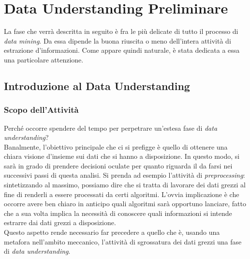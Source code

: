 
\chapter{Data Understanding Preliminare}

La fase che verrà descritta in seguito è fra le più delicate di tutto il processo di \textit{data mining}. Da essa dipende la buona riuscita o meno dell'intera attività di estrazione d'informazioni. Come appare quindi naturale, è stata dedicata a essa una particolare attenzione.

    \section{Introduzione al Data Understanding}

        \subsection{Scopo dell'Attività}

            Perché occorre spendere del tempo per perpetrare un'estesa fase di \textit{data understanding}? \\

            Banalmente, l'obiettivo principale che ci si prefigge è quello di ottenere una chiara visione d'insieme sui dati che si hanno a disposizione. In questo modo, si sarà in grado di prendere decisioni oculate per quanto riguarda il da farsi nei successivi passi di questa analisi. Si prenda ad esempio l'attività di \textit{preprocessing}: sintetizzando al massimo, possiamo dire che si tratta di lavorare dei dati grezzi al fine di renderli a essere processati da certi algoritmi. L'ovvia implicazione è che occorre avere ben chiaro in anticipo quali algoritmi sarà opportuno lanciare, fatto che a sua volta implica la necessità di conoscere quali informazioni si intende estrarre dai dati grezzi a disposizione. \\

            Questo aspetto rende necessario far precedere a quello che è, usando una metafora nell'ambito meccanico, l'attività di sgrossatura dei dati grezzi una fase di \textit{data understanding}. \\

